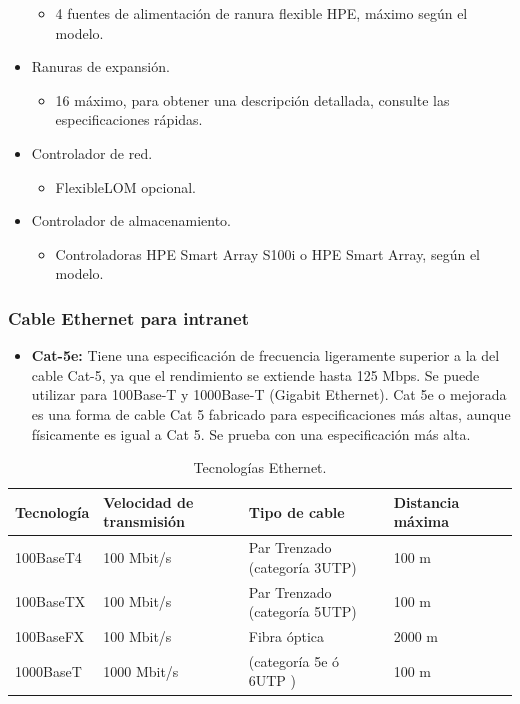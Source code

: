 \documentclass[12pt,letterpaper]{article}
\begin{document}
\begin{itemize}
\begin{itemize}
            \item 4 fuentes de alimentación de ranura flexible HPE, máximo según el modelo.
        \end{itemize}
    \item Ranuras de expansión.
        \begin{itemize} 
            \item 16 máximo, para obtener una descripción detallada, consulte las especificaciones rápidas.
        \end{itemize}
    \item Controlador de red.
        \begin{itemize} 
            \item FlexibleLOM opcional.
        \end{itemize}
    \item Controlador de almacenamiento.
        \begin{itemize} 
            \item Controladoras HPE Smart Array S100i o HPE Smart Array, según el modelo.
        \end{itemize}
\end{itemize}

\subsubsection{Cable Ethernet para intranet}
\begin{itemize}
    \item \textbf{Cat-5e: } Tiene una especificación de frecuencia ligeramente superior a la del cable Cat-5, ya que el rendimiento se extiende hasta 125 Mbps. Se puede utilizar para 100Base-T y 1000Base-T 
    (Gigabit Ethernet). Cat 5e o mejorada es una forma de cable Cat 5 fabricado para especificaciones más altas, aunque físicamente es igual a Cat 5. Se prueba con una especificación más alta.
\end{itemize}

\begin{table}[ht]
    \centering
    \begin{tabularx}{1.0\textwidth}{|l|l|l|l|l|}
    \hline
    Tecnología & Velocidad de transmisión & Tipo de cable & Distancia máxima \\ \hline
    100BaseT4 & 100 Mbit/s & Par Trenzado (categoría 3UTP) & 100 m \\ \hline
    100BaseTX & 100 Mbit/s & Par Trenzado (categoría 5UTP) & 100 m \\ \hline
    100BaseFX & 100 Mbit/s & Fibra óptica & 2000 m \\ \hline
    1000BaseT & 1000 Mbit/s & (categoría 5e ó 6UTP ) & 100 m \\ \hline
    \end{tabularx}
    \caption{Tecnologías Ethernet. \cite{ethernet}}
    \label{my-label}
\end{table}
\end{document}
